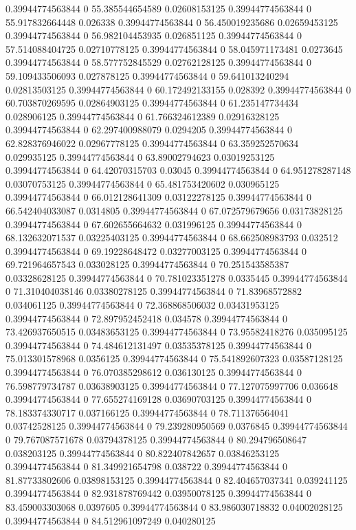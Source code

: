0.39944774563844 0 55.385544654589 0.02608153125
0.39944774563844 0 55.917832664448 0.026338
0.39944774563844 0 56.450019235686 0.02659453125
0.39944774563844 0 56.982104453935 0.026851125
0.39944774563844 0 57.514088404725 0.02710778125
0.39944774563844 0 58.045971173481 0.0273645
0.39944774563844 0 58.577752845529 0.02762128125
0.39944774563844 0 59.109433506093 0.027878125
0.39944774563844 0 59.641013240294 0.02813503125
0.39944774563844 0 60.172492133155 0.028392
0.39944774563844 0 60.703870269595 0.02864903125
0.39944774563844 0 61.235147734434 0.028906125
0.39944774563844 0 61.766324612389 0.02916328125
0.39944774563844 0 62.297400988079 0.0294205
0.39944774563844 0 62.828376946022 0.02967778125
0.39944774563844 0 63.359252570634 0.029935125
0.39944774563844 0 63.89002794623 0.03019253125
0.39944774563844 0 64.42070315703 0.03045
0.39944774563844 0 64.951278287148 0.03070753125
0.39944774563844 0 65.481753420602 0.030965125
0.39944774563844 0 66.012128641309 0.03122278125
0.39944774563844 0 66.542404033087 0.0314805
0.39944774563844 0 67.072579679656 0.03173828125
0.39944774563844 0 67.602655664632 0.031996125
0.39944774563844 0 68.132632071537 0.03225403125
0.39944774563844 0 68.662508983793 0.032512
0.39944774563844 0 69.19228648472 0.03277003125
0.39944774563844 0 69.721964657543 0.033028125
0.39944774563844 0 70.251543585387 0.03328628125
0.39944774563844 0 70.781023351278 0.0335445
0.39944774563844 0 71.310404038146 0.03380278125
0.39944774563844 0 71.83968572882 0.034061125
0.39944774563844 0 72.368868506032 0.03431953125
0.39944774563844 0 72.897952452418 0.034578
0.39944774563844 0 73.426937650515 0.03483653125
0.39944774563844 0 73.95582418276 0.035095125
0.39944774563844 0 74.484612131497 0.03535378125
0.39944774563844 0 75.013301578968 0.0356125
0.39944774563844 0 75.541892607323 0.03587128125
0.39944774563844 0 76.070385298612 0.036130125
0.39944774563844 0 76.598779734787 0.03638903125
0.39944774563844 0 77.127075997706 0.036648
0.39944774563844 0 77.655274169128 0.03690703125
0.39944774563844 0 78.183374330717 0.037166125
0.39944774563844 0 78.711376564041 0.03742528125
0.39944774563844 0 79.239280950569 0.0376845
0.39944774563844 0 79.767087571678 0.03794378125
0.39944774563844 0 80.294796508647 0.038203125
0.39944774563844 0 80.822407842657 0.03846253125
0.39944774563844 0 81.349921654798 0.038722
0.39944774563844 0 81.87733802606 0.03898153125
0.39944774563844 0 82.404657037341 0.039241125
0.39944774563844 0 82.931878769442 0.03950078125
0.39944774563844 0 83.459003303068 0.0397605
0.39944774563844 0 83.986030718832 0.04002028125
0.39944774563844 0 84.512961097249 0.040280125

